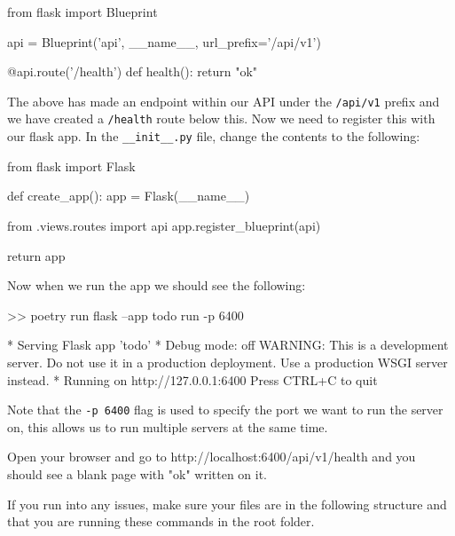 \documentclass{csse4400}
\begin{document}
\begin{code}[language=python]{}

  from flask import Blueprint

  api = Blueprint('api', __name__, url_prefix='/api/v1')

  @api.route('/health')
  def health():
      return "ok"

\end{code}

The above has made an endpoint within our API under the \texttt{/api/v1} prefix and we have created a \texttt{/health} route below this. Now we need to register this with our flask app. In the \texttt{\_\_init\_\_.py} file, change the contents to the following:

\begin{code}[language=python]{}
  from flask import Flask

  def create_app():
      app = Flask(__name__)
      
      from .views.routes import api
      app.register_blueprint(api)
      
      return app

\end{code}

Now when we run the app we should see the following:

\begin{code}[language=bash,numbers=none]{}
  >> poetry run flask --app todo run -p 6400

  * Serving Flask app 'todo'
  * Debug mode: off
  WARNING: This is a development server. Do not use it in a production deployment. Use a production WSGI server instead.
  * Running on http://127.0.0.1:6400
  Press CTRL+C to quit
\end{code}

Note that the \texttt{-p 6400} flag is used to specify the port we want to run the server on,
this allows us to run multiple servers at the same time.

Open your browser and go to http://localhost:6400/api/v1/health and you should see a blank page with "ok" written on it.


If you run into any issues, make sure your files are in the following structure and that you are running these commands in the root folder.
\end{document}
